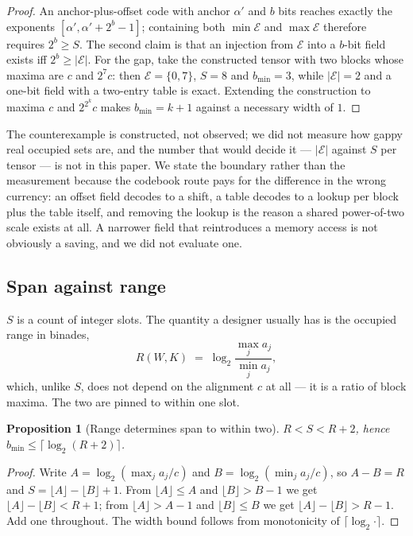 \documentclass[11pt]{article}
\newtheorem{proposition}[theorem]{Proposition}
\theoremstyle{definition}
\begin{document}
\begin{proof}
An anchor-plus-offset code with anchor $\alpha'$ and $b$ bits reaches exactly the
exponents $[\alpha', \alpha'+2^{b}-1]$; containing both $\min\mathcal{E}$ and
$\max\mathcal{E}$ therefore requires $2^{b} \ge S$. The second claim is that an
injection from $\mathcal{E}$ into a $b$-bit field exists iff
$2^{b} \ge |\mathcal{E}|$. For the gap, take the constructed tensor with two
blocks whose maxima are $c$ and $2^{7}c$: then $\mathcal{E} = \{0,7\}$,
$S = 8$ and $b_{\min} = 3$, while $|\mathcal{E}| = 2$ and a one-bit field with a
two-entry table is exact. Extending the construction to maxima $c$ and $2^{2^{k}}c$
makes $b_{\min} = k+1$ against a necessary width of $1$.
\end{proof}

The counterexample is constructed, not observed; we did not measure how gappy
real occupied sets are, and the number that would decide it --- $|\mathcal{E}|$
against $S$ per tensor --- is not in this paper. We state the boundary rather
than the measurement because the codebook route pays for the difference in the
wrong currency: an offset field decodes to a shift, a table decodes to a lookup
per block plus the table itself, and removing the lookup is the reason a shared
power-of-two scale exists at all. A narrower field that reintroduces a memory
access is not obviously a saving, and we did not evaluate one.

\subsection{Span against range}
\label{sec:widthspan}

$S$ is a count of integer slots. The quantity a designer usually has is the
occupied range in binades,
\[
  R(W,K) \;=\; \log_2 \frac{\max_j a_j}{\min_j a_j},
\]
which, unlike $S$, does not depend on the alignment $c$ at all --- it is a ratio
of block maxima. The two are pinned to within one slot.

\begin{proposition}[Range determines span to within two]
\label{prop:span}
$R < S < R + 2$, hence
$b_{\min} \le \lceil \log_2 (R+2) \rceil$.
\end{proposition}

\begin{proof}
Write $A = \log_2(\max_j a_j / c)$ and $B = \log_2(\min_j a_j / c)$, so
$A - B = R$ and $S = \lfloor A \rfloor - \lfloor B \rfloor + 1$. From
$\lfloor A \rfloor \le A$ and $\lfloor B \rfloor > B-1$ we get
$\lfloor A \rfloor - \lfloor B \rfloor < R + 1$; from $\lfloor A \rfloor > A-1$
and $\lfloor B \rfloor \le B$ we get $\lfloor A \rfloor - \lfloor B \rfloor > R-1$.
Add one throughout. The width bound follows from monotonicity of
$\lceil \log_2 \cdot \rceil$.
\end{proof}
\end{document}
